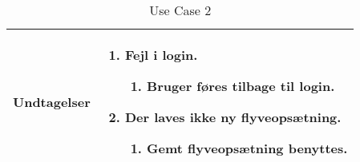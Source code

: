 \begin{table}[H]
\begin{tabular}{| p{3cm}| p{11.5cm}|}
Undtagelser							& 

									\renewcommand{\labelenumi}{\Roman{enumi}:}
									\renewcommand{\labelenumii}{\alph{enumii})}
									\begin{enumerate}[topsep=0.0cm,leftmargin=0.5cm]
										\item Fejl i login.
											\begin{enumerate}[topsep=0cm, leftmargin=1cm]
												\item Bruger føres tilbage til login.
											\end{enumerate}
										\vspace{0.4cm}
										\item Der laves ikke ny flyveopsætning.
											\begin{enumerate}[topsep=0cm, leftmargin=1cm]
												\item Gemt flyveopsætning benyttes.
											\end{enumerate}
									\end{enumerate} \\\hline
										

\end{tabular}
\caption{Use Case 2}
\label{tab:UC2}
\end{table}